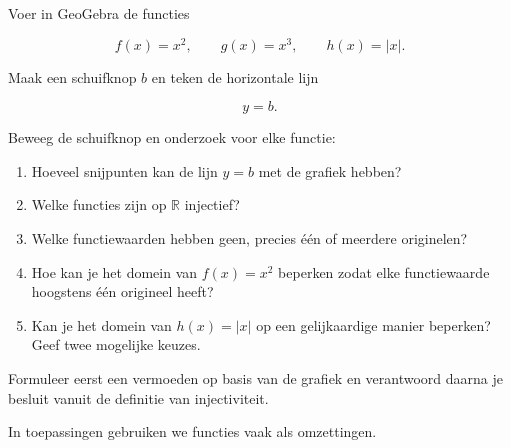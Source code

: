 \documentclass{ximera}
\begin{document}
\begin{fvdgeogebra}

    Voer in GeoGebra de functies
    
    \[
    f(x)=x^2,
    \qquad
    g(x)=x^3,
    \qquad
    h(x)=|x|.
    \]
    
    Maak een schuifknop \(b\) en teken de horizontale lijn
    
    \[
    y=b.
    \]
    
    Beweeg de schuifknop en onderzoek voor elke functie:
    
    \begin{enumerate}
    
        \item Hoeveel snijpunten kan de lijn \(y=b\) met de grafiek hebben?
    
        \item Welke functies zijn op \(\mathbb{R}\) injectief?
    
        \item Welke functiewaarden hebben geen, precies één of meerdere
              originelen?
    
        \item Hoe kan je het domein van \(f(x)=x^2\) beperken zodat elke
              functiewaarde hoogstens één origineel heeft?
    
        \item Kan je het domein van \(h(x)=|x|\) op een gelijkaardige manier
              beperken? Geef twee mogelijke keuzes.
    
    \end{enumerate}
    
    Formuleer eerst een vermoeden op basis van de grafiek en verantwoord
    daarna je besluit vanuit de definitie van injectiviteit.
    
    \end{fvdgeogebra}



In toepassingen gebruiken we functies vaak als omzettingen.
\end{document}
